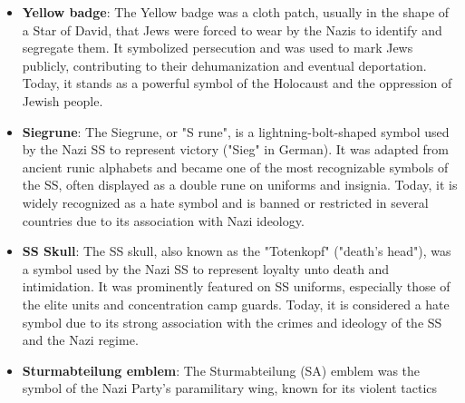\documentclass[11pt,a4paper,onecolumn]{article}
\begin{document}
\begin{itemize}
  \item \textbf{Yellow badge}: The Yellow badge was a cloth patch, usually in
  the shape of a Star of David, that Jews were forced to wear by the Nazis
  to identify and segregate them. It symbolized persecution and was used to
  mark Jews publicly, contributing to their dehumanization and eventual
  deportation. Today, it stands as a powerful symbol of the Holocaust and
  the oppression of Jewish people.
  \item \textbf{Siegrune}: The Siegrune, or "S rune", is a lightning-bolt-shaped
  symbol used by the Nazi SS to represent victory ("Sieg" in German). It was
  adapted from ancient runic alphabets and became one of the most recognizable
  symbols of the SS, often displayed as a double rune on uniforms and insignia.
  Today, it is widely recognized as a hate symbol and is banned or restricted
  in several countries due to its association with Nazi ideology.
  \item \textbf{SS Skull}: The SS skull, also known as the "Totenkopf" ("death's head"),
  was a symbol used by the Nazi SS to represent loyalty unto death and intimidation.
  It was prominently featured on SS uniforms, especially those of the elite units
  and concentration camp guards. Today, it is considered a hate symbol due to
  its strong association with the crimes and ideology of the SS and the Nazi regime.
  \item \textbf{Sturmabteilung emblem}: The Sturmabteilung (SA) emblem was the
  symbol of the Nazi Party's paramilitary wing, known for its violent tactics

\end{itemize}
\end{document}

